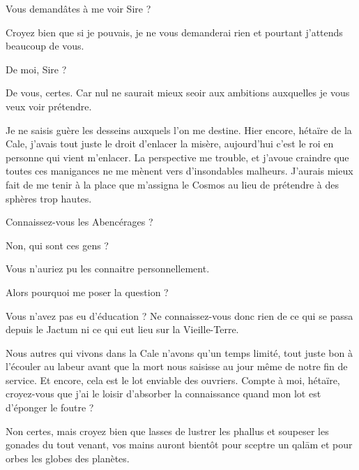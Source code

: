 \scene



\StageDirII{\elena, \ela}



\begin{drama}
  \elaspeaks Vous demandâtes à me voir Sire ?

  \elenaspeaks Croyez bien que si je pouvais, je ne vous demanderai rien et pourtant j’attends beaucoup de vous.

  \elaspeaks De moi, Sire ?

  \elenaspeaks De vous, certes. Car nul ne saurait mieux seoir aux ambitions auxquelles je vous veux voir prétendre.

  \elaspeaks Je ne saisis guère les desseins auxquels l’on me destine. Hier encore, hétaïre de la Cale, j’avais tout juste le droit d’enlacer la misère, aujourd’hui c’est le roi en personne qui vient m’enlacer. La perspective me trouble, et j’avoue craindre que toutes ces manigances ne me mènent vers d’insondables malheurs. J’aurais mieux fait de me tenir à la place que m’assigna le Cosmos au lieu de prétendre à des sphères trop hautes.

  \elenaspeaks Connaissez-vous les Abencérages ?

  \elaspeaks Non, qui sont ces gens ?

  \elenaspeaks {} Vous n’auriez pu les connaitre personnellement. 

  \elaspeaks Alors pourquoi me poser la question ?

  \elenaspeaks Vous n’avez pas eu d’éducation ? Ne connaissez-vous donc rien de ce qui se passa depuis le Jactum ni ce qui eut lieu sur la Vieille-Terre.

  \elaspeaks Nous autres qui vivons dans la Cale n’avons qu’un temps limité, tout juste bon à l’écouler au labeur avant que la mort nous saisisse au jour même de notre fin de service. Et encore, cela est le lot enviable des ouvriers. Compte à moi, hétaïre, croyez-vous que j’ai le loisir d’absorber la connaissance quand mon lot  est d’éponger le foutre ?

  \elenaspeaks Non certes, mais croyez bien que lasses de lustrer les phallus et soupeser les gonades du tout venant, vos mains auront bientôt pour sceptre un qalām et pour orbes les globes des planètes.


\end{drama}
